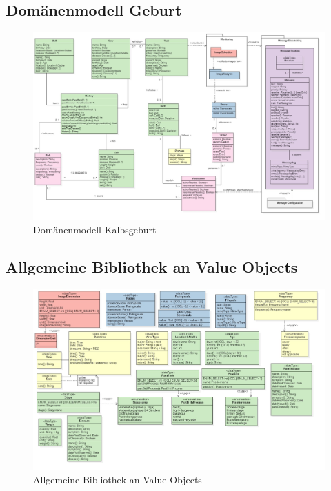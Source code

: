 \begin{landscape}

\subsection{Domänenmodell Geburt}
\begin{figure}[H]
	\center
	\includegraphics[scale=0.38]{Grafiken/modelle/domain-birth.jpg}
	\caption{Domänenmodell Kalbsgeburt} 
	\label{fig: Domänenmodell Kalbsgeburt}
\end{figure}


\subsection{Allgemeine Bibliothek an Value Objects }
\begin{figure}[H]
	\center
	\includegraphics[scale=0.4]{Grafiken/modelle/vo-general.jpg}
	\caption{Allgemeine Bibliothek an Value Objects} 
	\label{fig: Allgemeine Bibliothek an Value Objects}
\end{figure}


\end{landscape}
